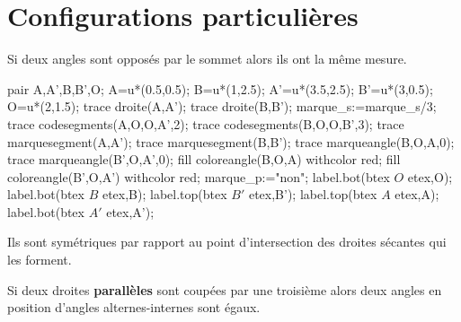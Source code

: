 \section{Configurations particulières}

\begin{propriete}
    Si deux angles sont opposés par le sommet alors ils ont la même mesure.
\end{propriete}

\begin{preuve}

    \vspace*{5mm}
    \begin{minipage}{0.3\linewidth}
        \begin{center}
            \begin{Geometrie}[CoinHD={(4u,3u)}]
                    pair A,A',B,B',O;
                    A=u*(0.5,0.5);
                    B=u*(1,2.5);
                    A'=u*(3.5,2.5);
                    B'=u*(3,0.5);
                    O=u*(2,1.5);
                    trace droite(A,A');
                    trace droite(B,B');
                    marque_s:=marque_s/3;
                    trace codesegments(A,O,O,A',2);
                    trace codesegments(B,O,O,B',3);                
                    trace marquesegment(A,A');
                    trace marquesegment(B,B');
                    trace marqueangle(B,O,A,0);
                    trace marqueangle(B',O,A',0);
                    fill coloreangle(B,O,A) withcolor red;
                    fill coloreangle(B',O,A') withcolor red;
                    marque_p:="non";
                    label.bot(btex $O$  etex,O);
                    label.bot(btex $B$  etex,B);
                    label.top(btex $B'$ etex,B');
                    label.top(btex $A$  etex,A);
                    label.bot(btex $A'$ etex,A');
            \end{Geometrie}
        \end{center}
    \end{minipage}
    \hfill
    \begin{minipage}{0.6\linewidth}
        Ils sont symétriques par rapport au point d'intersection des droites sécantes qui les forment.        
    \end{minipage}
\end{preuve}

\begin{propriete}
    Si deux droites \textbf{parallèles} sont coupées par une troisième alors deux angles en position d'angles alternes-internes sont égaux.
\end{propriete}

